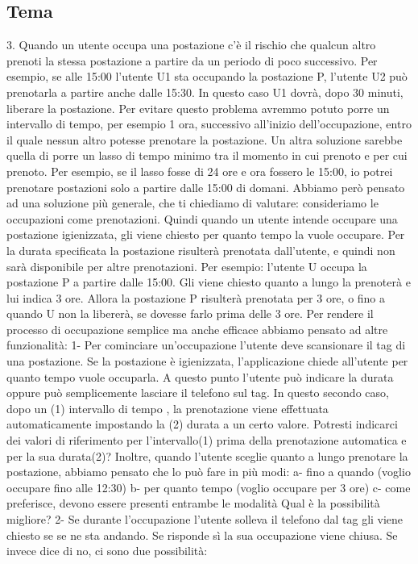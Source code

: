 \subsection*{Tema}
3. Quando un utente occupa una postazione c'è il rischio che qualcun altro prenoti la stessa postazione a partire da un periodo di poco successivo. Per esempio, se alle 15:00 l'utente U1 sta occupando la postazione P, l'utente U2 può prenotarla a partire anche dalle 15:30. In questo caso U1 dovrà, dopo 30 minuti, liberare la postazione.
Per evitare questo problema avremmo potuto porre un intervallo di tempo, per esempio 1 ora, successivo all'inizio dell'occupazione, entro il quale nessun altro potesse prenotare la postazione.
Un altra soluzione sarebbe quella di porre un lasso di tempo minimo tra il momento in cui prenoto e per cui prenoto. Per esempio, se il lasso fosse di 24 ore e ora fossero le 15:00, io potrei prenotare postazioni solo a partire dalle 15:00 di domani.
Abbiamo però pensato ad una soluzione più generale, che ti chiediamo di valutare: consideriamo le occupazioni come prenotazioni.
Quindi quando un utente intende occupare una postazione igienizzata, gli viene chiesto per quanto tempo la vuole occupare. Per la durata specificata la postazione risulterà prenotata dall'utente, e quindi non sarà disponibile per altre prenotazioni. Per esempio: l'utente U occupa la postazione P a partire dalle 15:00. Gli viene chiesto quanto a lungo la prenoterà e lui indica 3 ore. Allora la postazione P risulterà prenotata per 3 ore, o fino a quando U non la libererà, se dovesse farlo prima delle 3 ore.
Per rendere il processo di occupazione semplice ma anche efficace abbiamo pensato ad altre funzionalità:
1- Per cominciare un'occupazione l'utente deve scansionare il tag di una postazione. Se la postazione è igienizzata, l'applicazione chiede all'utente per quanto tempo vuole occuparla. A questo punto l'utente può indicare la durata oppure può semplicemente lasciare il telefono sul tag.
In questo secondo caso, dopo un (1) intervallo di tempo , la prenotazione viene effettuata automaticamente impostando la (2) durata a un certo valore. Potresti indicarci dei valori di riferimento per l'intervallo(1) prima della prenotazione automatica e per la sua durata(2)?
Inoltre, quando l'utente sceglie quanto a lungo prenotare la postazione, abbiamo pensato che lo può fare in più modi:
a- fino a quando (voglio occupare fino alle 12:30)
b- per quanto tempo (voglio occupare per 3 ore)
c- come preferisce, devono essere presenti entrambe le modalità
Qual è la possibilità migliore?
2- Se durante l'occupazione l'utente solleva il telefono dal tag gli viene chiesto se se ne sta andando. Se risponde sì la sua occupazione viene chiusa. Se invece dice di no, ci sono due possibilità:
